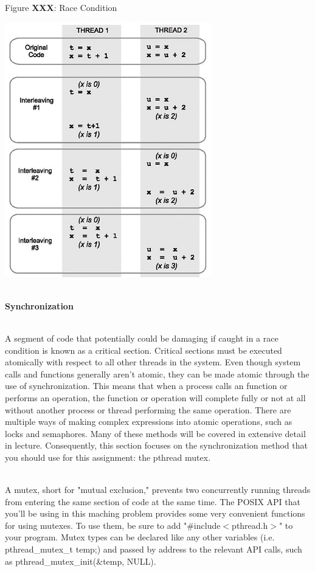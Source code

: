 \documentclass[12pt]{extarticle}
\newenvironment{myindentpar}[1]%
 {\begin{list}{}%
         {\setlength{\leftmargin}{#1}}%
         \item[]%
 }
 {\end{list}}
\begin{document}
\begin{myindentpar}{5mm}
    \begin{center}
        Figure \textbf{XXX}: Race Condition
    \end{center}
    \begin{center}
        \includegraphics{race_condition.png}
    \end{center}

    \ \\
    \textbf{Synchronization}
    
    \ \\
    A segment of code that potentially could be damaging if caught in a race condition is known as a critical section.  Critical sections must be executed atomically with respect to all other threads in the system.  Even though system calls and functions generally aren't atomic, they can be made atomic through the use of synchronization.  This means that when a process calls an function or performs an operation, the function or operation will complete fully or not at all without another process or thread performing the same operation.  There are multiple ways of making complex expressions into atomic operations, such as locks and semaphores.  Many of these methods will be covered in extensive detail in lecture.  Consequently, this section focuses on the synchronization method that you should use for this assignment: the pthread mutex.  
    
    \ \\
    A mutex, short for "mutual exclusion," prevents two concurrently running threads from entering the same section of code at the same time.  The POSIX API that you'll be using in this maching problem provides some very convenient functions for using mutexes.  To use them, be sure to add "\#include$<$pthread.h$>$" to your program.  Mutex types can be declared like any other variables (i.e. pthread\_mutex\_t temp;) and passed by address to the relevant API calls, such as pthread\_mutex\_init(\&temp, NULL).  
    

\end{myindentpar}
\end{document}
